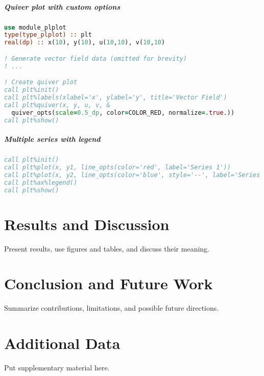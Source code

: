 \documentclass[12pt,a4paper]{report}
\begin{document}
\paragraph{Quiver plot with custom options}
\begin{lstlisting}[language=Fortran]
use module_plplot
type(type_plplot) :: plt
real(dp) :: x(10), y(10), u(10,10), v(10,10)

! Generate vector field data (omitted for brevity)
! ...

! Create quiver plot
call plt%init()
call plt%labels(xlabel='x', ylabel='y', title='Vector Field')
call plt%quiver(x, y, u, v, &
  quiver_opts(scale=0.5_dp, color=COLOR_RED, normalize=.true.))
call plt%show()
\end{lstlisting}

\paragraph{Multiple series with legend}
\begin{lstlisting}[language=Fortran]
call plt%init()
call plt%plot(x, y1, line_opts(color='red', label='Series 1'))
call plt%plot(x, y2, line_opts(color='blue', style='--', label='Series 2'))
call plt%ax%legend()
call plt%show()
\end{lstlisting}


\chapter{Results and Discussion}
Present results, use figures and tables, and discuss their meaning.

\chapter{Conclusion and Future Work}
Summarize contributions, limitations, and possible future directions.

\appendix
\chapter{Additional Data}
Put supplementary material here.

\printbibliography
\end{document}
